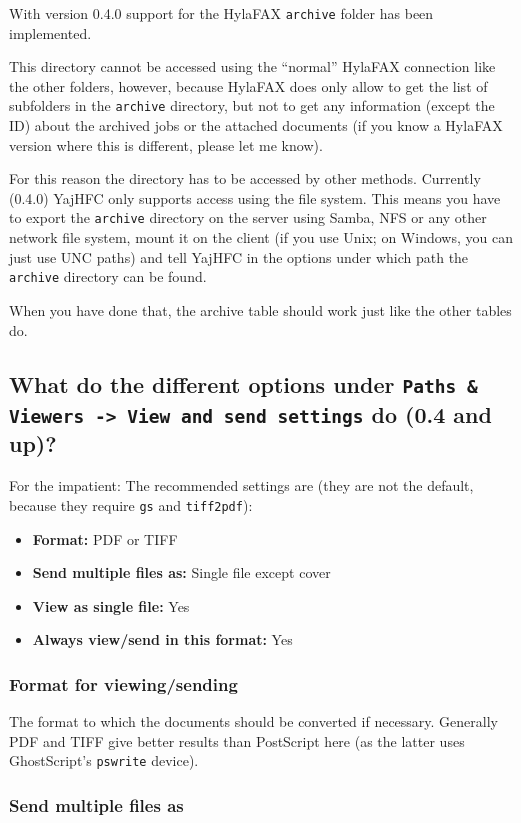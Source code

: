 \documentclass[a4paper,10pt]{scrartcl}
\begin{document}
With version 0.4.0 support for the HylaFAX \texttt{archive} folder has been implemented.

This directory cannot be accessed using the "`normal"' HylaFAX connection like the other folders, however, because HylaFAX does only allow to get the list of subfolders in the \texttt{archive} directory, but not to get any information (except the ID) about the archived jobs or the attached documents (if you know a HylaFAX version where this is different, please let me know).

For this reason the directory has to be accessed by other methods. Currently (0.4.0) YajHFC only supports access using the file system. This means you have to export the  \texttt{archive} directory on the server using Samba, NFS or any other network file system, mount it on the client (if you use Unix; on Windows, you can just use UNC paths) and tell YajHFC in the options under which path the \texttt{archive} directory can be found.

When you have done that, the archive table should work just like the other tables do.

\subsection{What do the different options under \texttt{Paths \& Viewers -> View and send settings} do (0.4 and up)?}

For the impatient: The recommended settings are (they are not the default, because they require \texttt{gs} and \texttt{tiff2pdf}):
\begin{itemize}
 \item \textbf{Format:} PDF or TIFF
 \item \textbf{Send multiple files as:} Single file except cover
 \item \textbf{View as single file:} Yes
 \item \textbf{Always view/send in this format:} Yes
\end{itemize}

\subsubsection{Format for viewing/sending}

The format to which the documents should be converted if necessary. Generally PDF and TIFF give better results than PostScript here (as the latter uses GhostScript's \texttt{pswrite} device).

\subsubsection{Send multiple files as}
\end{document}
